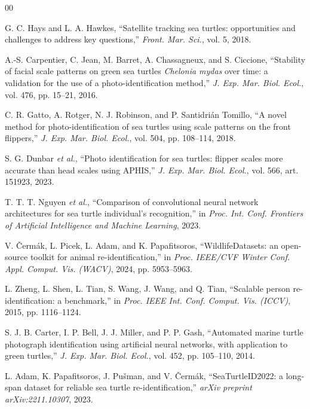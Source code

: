\documentclass[conference]{IEEEtran}
\begin{document}
\begin{thebibliography}{00}

  G. C. Hays and L. A. Hawkes, ``Satellite tracking sea turtles: opportunities and
  challenges to address key questions,'' \emph{Front. Mar. Sci.}, vol. 5, 2018.

  A.-S. Carpentier, C. Jean, M. Barret, A. Chassagneux, and S. Ciccione, ``Stability of
  facial scale patterns on green sea turtles \emph{Chelonia mydas} over time: a validation
  for the use of a photo-identification method,'' \emph{J. Exp. Mar. Biol. Ecol.},
  vol. 476, pp. 15--21, 2016.

  C. R. Gatto, A. Rotger, N. J. Robinson, and P. Santidri\'{a}n Tomillo, ``A novel method
  for photo-identification of sea turtles using scale patterns on the front flippers,''
  \emph{J. Exp. Mar. Biol. Ecol.}, vol. 504, pp. 108--114, 2018.

  S. G. Dunbar \emph{et al.}, ``Photo identification for sea turtles: flipper scales more
  accurate than head scales using APHIS,'' \emph{J. Exp. Mar. Biol. Ecol.}, vol. 566,
  art. 151923, 2023.

  T. T. T. Nguyen \emph{et al.}, ``Comparison of convolutional neural network architectures
  for sea turtle individual's recognition,'' in \emph{Proc. Int. Conf. Frontiers of
    Artificial Intelligence and Machine Learning}, 2023.

  V. \v{C}erm\'{a}k, L. Picek, L. Adam, and K. Papafitsoros, ``WildlifeDatasets: an
  open-source toolkit for animal re-identification,'' in \emph{Proc. IEEE/CVF Winter Conf.
    Appl. Comput. Vis. (WACV)}, 2024, pp. 5953--5963.

  L. Zheng, L. Shen, L. Tian, S. Wang, J. Wang, and Q. Tian, ``Scalable person
  re-identification: a benchmark,'' in \emph{Proc. IEEE Int. Conf. Comput. Vis. (ICCV)},
  2015, pp. 1116--1124.

  S. J. B. Carter, I. P. Bell, J. J. Miller, and P. P. Gash, ``Automated marine turtle
  photograph identification using artificial neural networks, with application to green
  turtles,'' \emph{J. Exp. Mar. Biol. Ecol.}, vol. 452, pp. 105--110, 2014.

  L. Adam, K. Papafitsoros, J. Pu\v{s}man, and V. \v{C}erm\'{a}k, ``SeaTurtleID2022: a
  long-span dataset for reliable sea turtle re-identification,'' \emph{arXiv preprint
    arXiv:2211.10307}, 2023.


\end{thebibliography}
\end{document}
